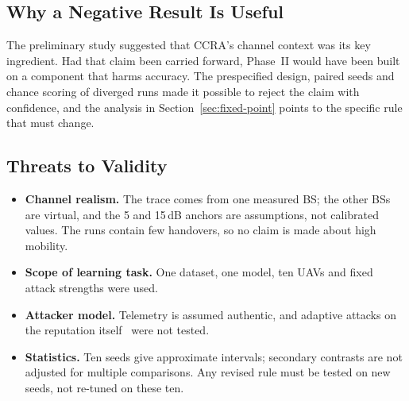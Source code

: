 \subsection{Why a Negative Result Is Useful}
The preliminary study suggested that CCRA's channel context was its key ingredient.
Had that claim been carried forward, Phase~II would have been built on a component
that harms accuracy. The prespecified design, paired seeds and chance scoring of
diverged runs made it possible to reject the claim with confidence, and the
analysis in Section~\ref{sec:fixed-point} points to the specific rule that must
change.

\subsection{Threats to Validity}
\begin{itemize}
\item \textbf{Channel realism.} The trace comes from one measured BS; the other BSs
  are virtual, and the 5 and 15\,dB anchors are assumptions, not calibrated values.
  The runs contain few handovers, so no claim is made about high mobility.
\item \textbf{Scope of learning task.} One dataset, one model, ten UAVs and fixed
  attack strengths were used.
\item \textbf{Attacker model.} Telemetry is assumed authentic, and adaptive attacks on
  the reputation itself~\cite{liu2026evade} were not tested.
\item \textbf{Statistics.} Ten seeds give approximate intervals; secondary contrasts
  are not adjusted for multiple comparisons. Any revised rule must be tested on new
  seeds, not re-tuned on these ten.
\end{itemize}
